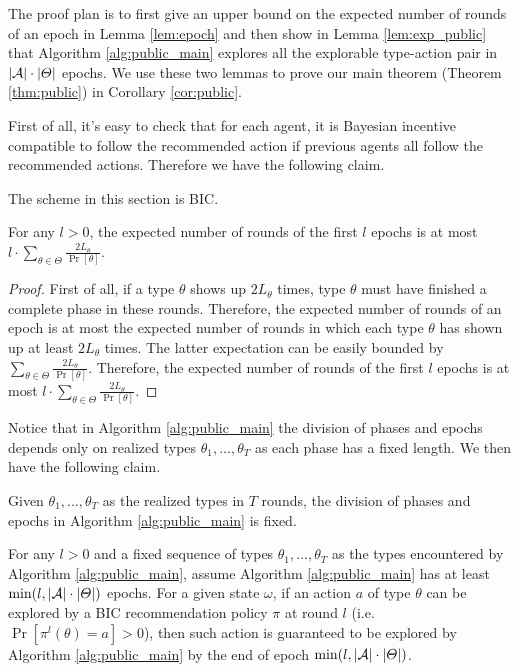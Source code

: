 The proof plan is to first give an upper bound on the expected number of rounds of an epoch in Lemma \ref{lem:epoch} and then show in Lemma \ref{lem:exp_public} that Algorithm \ref{alg:public_main} explores all the explorable type-action pair in $|\mathcal{A}| \cdot |\varTheta|$ epochs. We use these two lemmas to prove our main theorem (Theorem \ref{thm:public}) in Corollary \ref{cor:public}.

First of all, it's easy to check that for each agent, it is Bayesian incentive compatible to follow the recommended action if previous agents all follow the recommended actions. Therefore we have the following claim.
\begin{claim}
\label{clm:public_BIC}
The scheme in this section is BIC.
\end{claim}

\begin{lemma}
\label{lem:epoch}
For any $l>0$, the expected number of rounds of the first $l$ epochs is at most $l \cdot \sum_{\theta\in\varTheta} \frac{2L_{\theta}}{\Pr[\theta]}$.
\end{lemma}

\begin{proof}
First of all, if a type $\theta$ shows up $2L_{\theta}$ times, type $\theta$ must have finished a complete phase in these rounds. Therefore, the expected number of rounds of an epoch is at most the expected number of rounds in which each type $\theta$ has shown up at least $2L_{\theta}$ times. The latter expectation can be easily bounded by $\sum_{\theta\in\varTheta} \frac{2L_{\theta}}{\Pr[\theta]}$. Therefore, the expected number of rounds of the first $l$ epochs is at most $l \cdot \sum_{\theta\in\varTheta} \frac{2L_{\theta}}{\Pr[\theta]}$.
\end{proof}

Notice that in Algorithm \ref{alg:public_main} the division of phases and epochs depends only on realized types $\theta_1,...,\theta_T$ as each phase has a fixed length. We then have the following claim.
\begin{claim}
Given $\theta_1,...,\theta_T$ as the realized types in $T$ rounds, the division of phases and epochs in Algorithm \ref{alg:public_main} is fixed.
\end{claim}

\begin{lemma}
\label{lem:exp_public}
For any $l>0$ and a fixed sequence of types $\theta_1,...,\theta_T$ as the types encountered by Algorithm \ref{alg:public_main}, assume Algorithm \ref{alg:public_main} has at least $\min(l, |\mathcal{A}|\cdot |\varTheta|)$ epochs.
For a given state $\omega$, if an action $a$ of type $\theta$ can be explored by a BIC recommendation policy $\pi$ at round $l$ (i.e. $ \Pr[\pi^l(\theta)= a]> 0$), then such action is guaranteed to be explored by Algorithm \ref{alg:public_main} by the end of epoch $\min(l, |\mathcal{A}|\cdot |\varTheta|)$.
\end{lemma}

